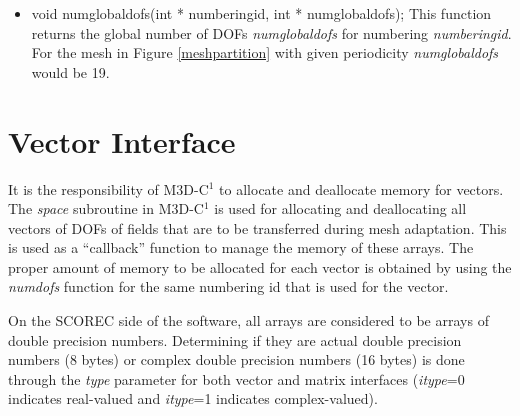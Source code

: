 \begin{itemize}
\item  void numglobaldofs(int * numberingid, int * numglobaldofs);
This function returns the global number of DOFs \textit{numglobaldofs} for numbering \textit{numberingid}. 
 For the mesh in Figure \ref{meshpartition} with given periodicity \textit{numglobaldofs} would be 19.

\end{itemize}
\section{Vector Interface}
It is the responsibility of M3D-C$^1$ to allocate and deallocate memory for vectors.  The \textit{space}
subroutine in M3D-C$^1$ is used for allocating and deallocating all vectors of DOFs of fields
that are to be transferred during mesh adaptation.  This is used as a ``callback'' function to 
manage the memory of these arrays.  The proper amount of memory to be allocated for each vector
is obtained by using the \textit{numdofs} function for the same numbering id that is used
for the vector.

On the SCOREC side of the software, all arrays are considered to be arrays of double precision numbers.
Determining if they are actual double precision numbers (8 bytes) or complex double precision numbers
(16 bytes) is done through the \textit{type} parameter for both vector and matrix interfaces 
(\textit{itype}=0 indicates real-valued and \textit{itype}=1 indicates complex-valued).  

